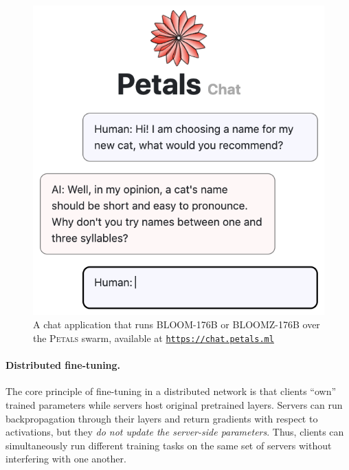 \begin{figure}[tb]
    \centering
    \includegraphics[width=0.9\linewidth]{resources/chat_app.png}
    \caption{A chat application that runs BLOOM-176B or BLOOMZ-176B over the \textsc{Petals} swarm, available at \texttt{\href{https://chat.petals.ml}{https://chat.petals.ml}}}
    \label{fig:chat_app}
    \vspace{-10pt}
\end{figure}

\paragraph{Distributed fine-tuning.} The core principle of fine-tuning in a distributed network is that clients ``own'' trained parameters while servers host original pretrained layers. Servers can run backpropagation through their layers and return gradients with respect to activations, but they \textit{do not update the server-side parameters}. Thus, clients can simultaneously run different training tasks on the same set of servers without interfering with one another.


